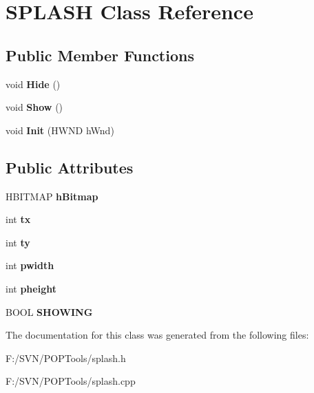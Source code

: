 \hypertarget{class_s_p_l_a_s_h}{\section{S\-P\-L\-A\-S\-H Class Reference}
\label{class_s_p_l_a_s_h}
}
\subsection*{Public Member Functions}
\begin{DoxyCompactItemize}
\item 
\hypertarget{class_s_p_l_a_s_h_ae76abea4e72dd41ffa9c15a1579513fa}{void {\bfseries Hide} ()}\label{class_s_p_l_a_s_h_ae76abea4e72dd41ffa9c15a1579513fa}

\item 
\hypertarget{class_s_p_l_a_s_h_a517a30018f5e8d99922607768fbd8e5a}{void {\bfseries Show} ()}\label{class_s_p_l_a_s_h_a517a30018f5e8d99922607768fbd8e5a}

\item 
\hypertarget{class_s_p_l_a_s_h_a5ab3e3a61d274b071b862598a535ae7c}{void {\bfseries Init} (H\-W\-N\-D h\-Wnd)}\label{class_s_p_l_a_s_h_a5ab3e3a61d274b071b862598a535ae7c}

\end{DoxyCompactItemize}
\subsection*{Public Attributes}
\begin{DoxyCompactItemize}
\item 
\hypertarget{class_s_p_l_a_s_h_ab3eb1f4b9d1845d16352c3daf691c505}{H\-B\-I\-T\-M\-A\-P {\bfseries h\-Bitmap}}\label{class_s_p_l_a_s_h_ab3eb1f4b9d1845d16352c3daf691c505}

\item 
\hypertarget{class_s_p_l_a_s_h_ae8fd1b18e3b6289d0c65f112e058bb4d}{int {\bfseries tx}}\label{class_s_p_l_a_s_h_ae8fd1b18e3b6289d0c65f112e058bb4d}

\item 
\hypertarget{class_s_p_l_a_s_h_afb62d7de09957ec6bee6fafb804ef91f}{int {\bfseries ty}}\label{class_s_p_l_a_s_h_afb62d7de09957ec6bee6fafb804ef91f}

\item 
\hypertarget{class_s_p_l_a_s_h_aa1e2d3fee453ed4b87eabbf8b4954b58}{int {\bfseries pwidth}}\label{class_s_p_l_a_s_h_aa1e2d3fee453ed4b87eabbf8b4954b58}

\item 
\hypertarget{class_s_p_l_a_s_h_a37518cda0eef4a0f2fdc1b1c0fb08459}{int {\bfseries pheight}}\label{class_s_p_l_a_s_h_a37518cda0eef4a0f2fdc1b1c0fb08459}

\item 
\hypertarget{class_s_p_l_a_s_h_aced601d0773a97ebc35fd0add43e0c75}{B\-O\-O\-L {\bfseries S\-H\-O\-W\-I\-N\-G}}\label{class_s_p_l_a_s_h_aced601d0773a97ebc35fd0add43e0c75}

\end{DoxyCompactItemize}


The documentation for this class was generated from the following files\-:\begin{DoxyCompactItemize}
\item 
F\-:/\-S\-V\-N/\-P\-O\-P\-Tools/splash.\-h\item 
F\-:/\-S\-V\-N/\-P\-O\-P\-Tools/splash.\-cpp\end{DoxyCompactItemize}
